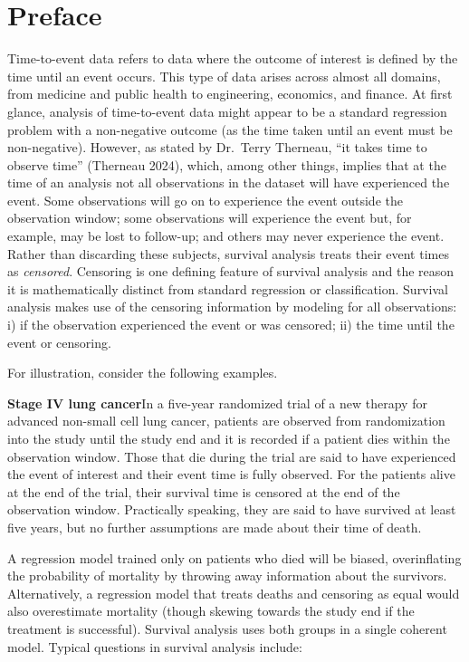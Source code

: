 \documentclass[
  letterpaper,
  krantz2]{style/krantz}
\begin{document}
\vspace*{\fill}
\clearpage


\tableofcontents

\chapter*{Preface}

Time-to-event data refers to data where the outcome of interest is
defined by the time until an event occurs. This type of data arises
across almost all domains, from medicine and public health to
engineering, economics, and finance. At first glance, analysis of
time-to-event data might appear to be a standard regression problem with
a non-negative outcome (as the time taken until an event must be
non-negative). However, as stated by Dr.~Terry Therneau, ``it takes time
to observe time'' (Therneau 2024), which, among other things, implies
that at the time of an analysis not all observations in the dataset will
have experienced the event. Some observations will go on to experience
the event outside the observation window; some observations will
experience the event but, for example, may be lost to follow-up; and
others may never experience the event. Rather than discarding these
subjects, survival analysis treats their event times as \emph{censored}.
Censoring is one defining feature of survival analysis and the reason it
is mathematically distinct from standard regression or classification.
Survival analysis makes use of the censoring information by modeling for
all observations: i) if the observation experienced the event or was
censored; ii) the time until the event or censoring.

For illustration, consider the following examples.

\textbf{Stage IV lung cancer}\newline In a five-year randomized trial of
a new therapy for advanced non-small cell lung cancer, patients are
observed from randomization into the study until the study end and it is
recorded if a patient dies within the observation window. Those that die
during the trial are said to have experienced the event of interest and
their event time is fully observed. For the patients alive at the end of
the trial, their survival time is censored at the end of the observation
window. Practically speaking, they are said to have survived at least
five years, but no further assumptions are made about their time of
death.

A regression model trained only on patients who died will be biased,
overinflating the probability of mortality by throwing away information
about the survivors. Alternatively, a regression model that treats
deaths and censoring as equal would also overestimate mortality (though
skewing towards the study end if the treatment is successful). Survival
analysis uses both groups in a single coherent model. Typical questions
in survival analysis include:
\end{document}
